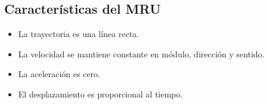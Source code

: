 \subsection{Características del MRU}

\begin{itemize}
    \setlength{\itemsep}{0pt}
    \item La trayectoria es una línea recta.
    \item La velocidad se mantiene constante en módulo, dirección y sentido.
    \item La aceleración es cero.
    \item El desplazamiento es proporcional al tiempo.
\end{itemize}
